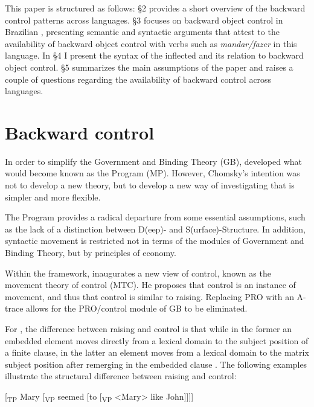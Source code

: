 \documentclass[output=paper]{langsci/langscibook}
\begin{document}
This paper is structured as follows: §2 provides a short overview of the backward control patterns across languages. §3 focuses on backward object control in Brazilian , presenting semantic and syntactic arguments that attest to the availability of backward object control with verbs such as \textit{mandar\slash fazer} in this language. In §4 I present the syntax of the inflected  and its relation to backward object control. §5 summarizes the main assumptions of the paper and raises a couple of questions regarding the availability of backward control across languages.

\section{Backward control}%

In order to simplify the Government and Binding Theory (GB), \citet{Chomsky1993} developed what would become known as the  Program (MP). However, Chomsky’s intention was not to develop a new theory, but to develop a new way of investigating that is simpler and more flexible.

The  Program provides a radical departure from some essential assumptions, such as the lack of a distinction between D(eep)- and S(urface)-Structure. In addition, syntactic movement is restricted not in terms of the modules of Government and Binding Theory, but by principles of economy. 

Within the  framework, \citet{Hornstein1999,Hornstein2001} inaugurates a new view of control, known as the movement theory of control (MTC). He proposes that control is an instance of movement, and thus that control is similar to raising. Replacing PRO with an A-trace allows for the PRO\slash control module of GB to be eliminated.

For \citet{Hornstein1999}, the difference between raising and control is that while in the former an embedded element moves directly from a lexical domain to the subject position of a finite clause, in the latter an element moves from a lexical domain to the matrix subject position after remerging in the embedded clause \citep{Boeckx2006}. The following examples illustrate the structural difference between raising and control:

\ea%
    \label{ex:moreno:3b}
[\textsubscript{TP} Mary [\textsubscript{VP} seemed [to [\textsubscript{VP} <Mary> like John]]]]
\z
\end{document}
